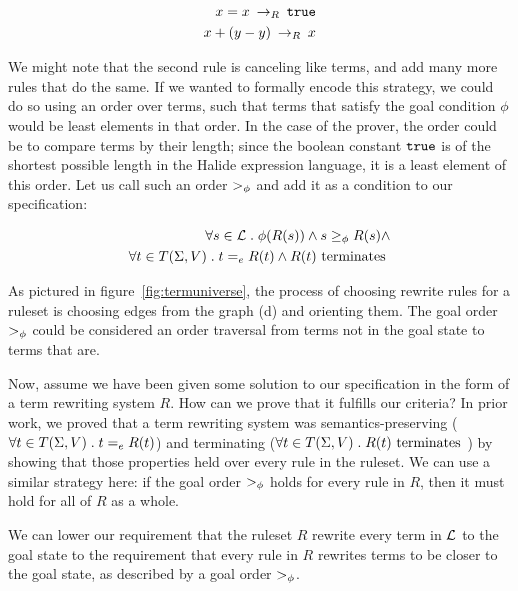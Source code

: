 \begin{align*}
    x = x \:\rightarrow_{R}\: \texttt{true} \\
    x + (y - y) \:\rightarrow_{R}\: x
\end{align*}

We might note that the second rule is canceling like terms, and add many more rules that do the same. If we wanted to formally encode this strategy, we could do so using an order over terms, such that terms that satisfy the goal condition $\phi$ would be least elements in that order. In the case of the prover, the order could be to compare terms by their length; since the boolean constant $\texttt{true}$ is of the shortest possible length in the Halide expression language, it is a least element of this order. Let us call such an order $>_{\phi}$ and add it as a condition to our specification:

\begin{align*}
\forall s \in \mathcal{L} \;.\; \phi(R(s)) \wedge  s \geq_{\phi} R(s) \wedge \\
\forall t \in T(\Sigma,V) \;.\; t =_e R(t) \wedge  R(t) \textrm{ terminates }
\end{align*}

As pictured in figure~\ref{fig:termuniverse}, the process of choosing rewrite rules for a ruleset is choosing edges from the graph (d) and orienting them. The goal order $>_{\phi}$ could be considered an order traversal from terms not in the goal state to terms that are. 

Now, assume we have been given some solution to our specification in the form of a term rewriting system $R$. How can we prove that it fulfills our criteria? In prior work, we proved that a term rewriting system was semantics-preserving ($\forall t \in T(\Sigma,V) \;.\; t =_e R(t)$) and terminating ($\forall t \in T(\Sigma,V) \;.\; R(t) \textrm{ terminates }$) by showing that those properties held over every rule in the ruleset. We can use a similar strategy here: if the goal order $>_{\phi}$ holds for every rule in $R$, then it must hold for all of $R$ as a whole.

\begin{assumption}
We can lower our requirement that the ruleset $R$ rewrite every term in $\mathcal{L}$ to the goal state to the requirement that every rule in $R$ rewrites terms to be closer to the goal state, as described by a goal order $>_{\phi}$.
\end{assumption}

